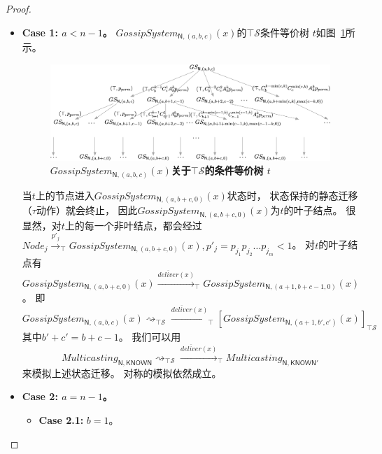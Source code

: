 \begin{proof}
\begin{itemize}
{        %
        \begin{itemize}
            \item {\textbf{Case 1: $a<n-1$。}
            $GossipSystem_{\mathsf{N},(a,b,c)}(x)$的$\top \mathcal{S}$条件等价树 $t$如图~\ref{fig:epsilon_1}所示。
            \begin{figure}[!htbp]
            	\small
            	\centering
            	\includegraphics[width=14cm]{../figure/epsilon_tree1.png}
                \caption{\textbf{$GossipSystem_{\mathsf{N},(a,b,c)}(x)$关于$\top\mathcal{S}$的条件等价树 $t$}}
                \label{fig:epsilon_1}
            \end{figure}
            当$t$上的节点进入$GossipSystem_{\mathsf{N},(a,b+c,0)}(x)$状态时，
            状态保持的静态迁移（$\tau$动作）就会终止，
            因此$GossipSystem_{\mathsf{N},(a,b+c,0)}(x)$为$t$的叶子结点。
            很显然，对$t$上的每一个非叶结点，都会经过$Node_j\stackrel{p'_j}{\rightarrow}_{\top}GossipSystem_{\mathsf{N},(a,b+c,0)}(x),p'_j=p_{j_1}p_{j_2}\dots p_{j_m}<1$。
            对$t$的叶子结点有$GossipSystem_{\mathsf{N},(a,b+c,0)}(x)\stackrel{\overline{deliver}(x)}{\longrightarrow}_{\top} GossipSystem_{\mathsf{N},(a+1,b+c-1,0)}(x)$。
            即
            $$GossipSystem_{\mathsf{N},(a,b,c)}(x)\rightsquigarrow_{\top\mathcal{S}}\stackrel{\overline{deliver}(x)}{\longrightarrow}_{\top}[GossipSystem_{\mathsf{N},(a+1,b',c')}(x)]_{\top\mathcal{S}}$$
            其中$b'+c'=b+c-1$。
            我们可以用$$Multicasting_{\mathsf{N},\mathsf{KNOWN}}\rightsquigarrow_{\top\mathcal{S}}\stackrel{\overline{deliver}(x)}{\longrightarrow}_{\top} Multicasting_{\mathsf{N}, \mathsf{KNOWN}'}$$来模拟上述状态迁移。
            对称的模拟依然成立。
            }
            \item {\textbf{Case 2: $a=n-1$。}
            \begin{itemize}
               \item {
                  {\textbf{Case 2.1:} $b=1$。}
}
\end{itemize}}
\end{itemize}}
\end{itemize}
\end{proof}
